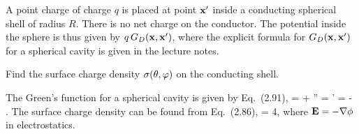 \newcommand{\vF}{\vec{F}}
\newcommand{\nabx}{\nabla_{\!x}}

\begin{statement}{}
	A point charge of charge $q$ is placed at point $\mathbf{x}'$ inside a conducting spherical shell of radius $R$.  There is no net charge on the conductor.  The potential inside the sphere is thus given by $q \, G_D(\mathbf{x}, \mathbf{x}')$, where the explicit formula for $G_D(\mathbf{x}, \mathbf{x}')$ for a spherical cavity is given in the lecture notes.
\end{statement}

\begin{problem}
	Find the surface charge density $\sigma(\theta, \varphi)$ on the conducting shell.
\end{problem}

\begin{solution}
	The Green's function for a spherical cavity is given by Eq.~(2.91),
	\beq
		\Gdxxp =  +   \vx'' = \vx'  \qand \alp = - .
	\eeq
	The surface charge density can be found from Eq.~(2.86),
	\beqn \label{scdeq}
		\vE \cdot \nh = 4\pi \sig,
	\eeqn
	where $\mathbf{E} = -\nabla \phi$ in electrostatics.
	

\end{solution}
